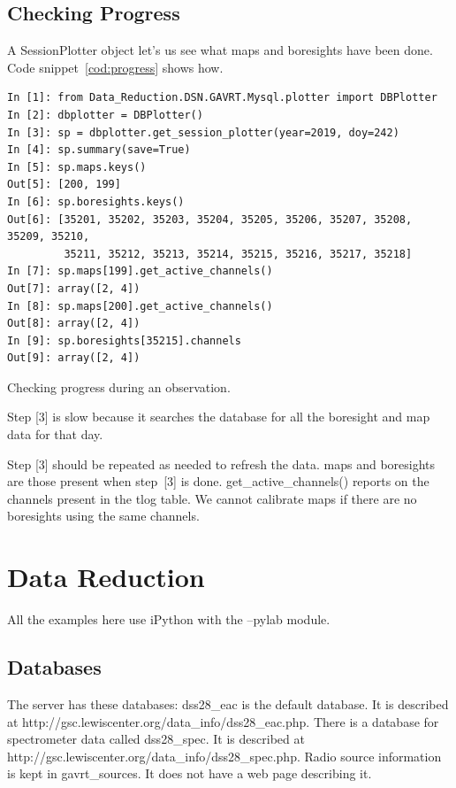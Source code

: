 \documentclass[letterpaper,11pt]{report}
\begin{document}
\section{Checking Progress}

A {\ttfamily SessionPlotter} object let's us see what maps and boresights have
been done. Code snippet~\ref{cod:progress} shows how.
\begin{code}[h!tb]
    \begin{center}
        {\scriptsize \begin{verbatim}
In [1]: from Data_Reduction.DSN.GAVRT.Mysql.plotter import DBPlotter
In [2]: dbplotter = DBPlotter()
In [3]: sp = dbplotter.get_session_plotter(year=2019, doy=242)
In [4]: sp.summary(save=True)
In [5]: sp.maps.keys()
Out[5]: [200, 199]
In [6]: sp.boresights.keys()
Out[6]: [35201, 35202, 35203, 35204, 35205, 35206, 35207, 35208, 35209, 35210,
         35211, 35212, 35213, 35214, 35215, 35216, 35217, 35218]
In [7]: sp.maps[199].get_active_channels()
Out[7]: array([2, 4])
In [8]: sp.maps[200].get_active_channels()
Out[8]: array([2, 4])
In [9]: sp.boresights[35215].channels
Out[9]: array([2, 4])\end{verbatim}
        }\caption{\label{cod:progress}Checking progress during an observation.}
    \end{center}
\end{code}
Step [3] is slow because it searches the database for all the boresight and map 
data for that day.

Step [3] should be repeated as needed to refresh the data. {\ttfamily maps}
and {\ttfamily boresights} are those present when step~[3] is done.
{\ttfamily get\_active\_channels()} reports on the channels present in the
{\ttfamily tlog} table.  We cannot calibrate maps if there are no boresights
using the same channels.



\chapter{Data Reduction}\label{ch:datared}

All the examples here use iPython with the {\ttfamily --pylab} module.

\section{Databases}

The server has these databases: {\ttfamily dss28\_eac} is the default database.
It is described at {\ttfamily http://gsc.lewiscenter.org/data\_info/dss28\_eac.php}.
There is a database for spectrometer data called {\ttfamily dss28\_spec}.
It is described at {\ttfamily http://gsc.lewiscenter.org/data\_info/dss28\_spec.php}.
Radio source information is kept in {\ttfamily gavrt\_sources}.  It does not
have a web page describing it.
\end{document}
